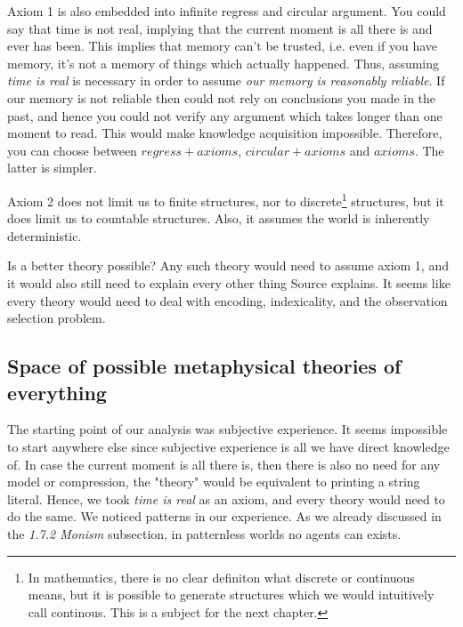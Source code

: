 Axiom 1 is also embedded into infinite regress and circular argument.
You could say that time is not real, implying that the current moment is all there is and ever has been.
This implies that memory can't be trusted, i.e. even if you have memory, it's not a memory of things which actually happened.
Thus, assuming \textit{time is real} is necessary in order to assume \textit{our memory is reasonably reliable}.
If our memory is not reliable then could not rely on conclusions you made in the past, and hence you could not verify any argument which takes longer than one moment to read.
This would make knowledge acquisition impossible.
Therefore, you can choose between $regress + axioms$, $circular + axioms$ and $axioms$.
The latter is simpler.

Axiom 2 does not limit us to finite structures, nor to discrete\footnote{In mathematics, there is no clear definiton what discrete or continuous means, but it is possible to generate structures which we would intuitively call continous. This is a subject for the next chapter.} structures, but it does limit us to countable structures. Also, it assumes the world is inherently deterministic.

Is a better theory possible?
Any such theory would need to assume axiom 1, and it would also still need to explain every other thing Source explains.
It seems like every theory would need to deal with encoding, indexicality, and the observation selection problem.


\newpage

\subsection{Space of possible metaphysical theories of everything}

The starting point of our analysis was subjective experience.
It seems impossible to start anywhere else since subjective experience is all we have direct knowledge of.
In case the current moment is all there is, then there is also no need for any model or compression, the "theory" would be equivalent to printing a string literal.
Hence, we took \textit{time is real} as an axiom, and every theory would need to do the same.
We noticed patterns in our experience. As we already discussed in the \textit{1.7.2 Monism} subsection, in patternless worlds no agents can exists.


